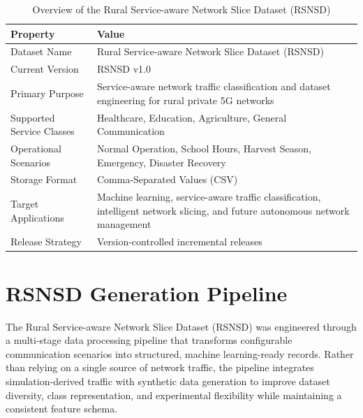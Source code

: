 \documentclass[12pt,a4paper]{report}
\begin{document}
	\begin{table}[H]
		\centering
		\caption{Overview of the Rural Service-aware Network Slice Dataset (RSNSD)}
		\label{tab:rsnsd_overview}
		
		\begin{tabular}{|p{5cm}|p{10cm}|}
			\hline
			
			\textbf{Property} &
			\textbf{Value}
			\\
			\hline
			
			Dataset Name &
			Rural Service-aware Network Slice Dataset (RSNSD)
			\\
			\hline
			
			Current Version &
			RSNSD v1.0
			\\
			\hline
			
			Primary Purpose &
			Service-aware network traffic classification and dataset engineering for rural private 5G networks
			\\
			\hline
			
			Supported Service Classes &
			Healthcare, Education, Agriculture, General Communication
			\\
			\hline
			
			Operational Scenarios &
			Normal Operation, School Hours, Harvest Season, Emergency, Disaster Recovery
			\\
			\hline
			
			Storage Format &
			Comma-Separated Values (CSV)
			\\
			\hline
			
			Target Applications &
			Machine learning, service-aware traffic classification, intelligent network slicing, and future autonomous network management
			\\
			\hline
			
			Release Strategy &
			Version-controlled incremental releases
			\\
			\hline
			
		\end{tabular}
		
	\end{table}
	
	
	\section{RSNSD Generation Pipeline}
	\label{sec:rsnsd_pipeline}
	
	The Rural Service-aware Network Slice Dataset (RSNSD) was engineered through a multi-stage data processing pipeline that transforms configurable communication scenarios into structured, machine learning-ready records. Rather than relying on a single source of network traffic, the pipeline integrates simulation-derived traffic with synthetic data generation to improve dataset diversity, class representation, and experimental flexibility while maintaining a consistent feature schema.
	
\end{document}
